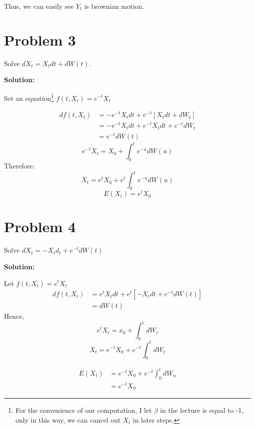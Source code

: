 \documentclass[11pt]{article} %
\begin{document}
Thus, we can easily see $Y_t$ is brownian motion.

\section*{Problem 3}
Solve $dX_t = X_tdt + dW(t)$.

\textbf{Solution:}

Set an equation\footnote{For the convenience of our computation, I let $\beta$ in the lecture is equal to -1, only in this way, we can cancel out $X_t$ in later steps.} $f(t,X_t) = e^{-t}X_t$

\begin{align*}
    df(t,X_t) &= -e^{-t}X_tdt + e^{-t}[X_tdt + dW_t]\\
              &= -e^{-t}X_tdt + e^{-t}X_tdt + e^{-t}dW_t\\
              &= e^{-t}dW(t)
\end{align*}
\begin{equation*}
    e^{-t}X_t = X_0 + \int_0^t e^{-u}dW(u)
\end{equation*}
Therefore:
\begin{equation*}
    X_t = e^tX_0 +e^t \int_0^t e^{-u}dW(u)
\end{equation*}
\begin{equation*}
    E(X_t) = e^tX_0
\end{equation*}


\section*{Problem 4}
Solve $dX_t = -X_td_t +e^{-t}dW(t)$

\textbf{Solution:}

Let $f(t,X_t) = e^tX_t$
\begin{align*}
    df(t,X_t) &= e^tX_tdt + e^t[-X_tdt + e^{-t}dW(t)]\\
             &= dW(t)
\end{align*}
Hence,
\begin{equation*}
    e^tX_t = x_0 + \int_0^t dW_t
\end{equation*}
\begin{equation*}
    X_t = e^{-t}X_0 +e^{-t}\int_0^t dW_t
\end{equation*}

\begin{align*}
    E(X_t) &= e^{-t}X_0 +e^{-t}\int_0^t dW_u\\
        &= e^{-t}X_0
\end{align*}
\end{document}
